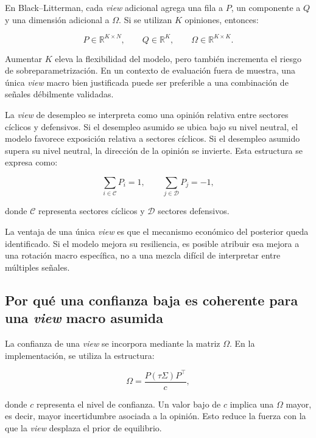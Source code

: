 \documentclass[11pt]{article}
\begin{document}
En Black--Litterman, cada \textit{view} adicional agrega una fila a $P$, un componente a $Q$ y una dimensi\'on adicional a $\Omega$. Si se utilizan $K$ opiniones, entonces:

\begin{equation}
    P \in \mathbb{R}^{K \times N},
    \qquad
    Q \in \mathbb{R}^{K},
    \qquad
    \Omega \in \mathbb{R}^{K \times K}.
\end{equation}

Aumentar $K$ eleva la flexibilidad del modelo, pero tambi\'en incrementa el riesgo de sobreparametrizaci\'on. En un contexto de evaluaci\'on fuera de muestra, una \'unica \textit{view} macro bien justificada puede ser preferible a una combinaci\'on de se\~nales d\'ebilmente validadas.

La \textit{view} de desempleo se interpreta como una opini\'on relativa entre sectores c\'iclicos y defensivos. Si el desempleo asumido se ubica bajo su nivel neutral, el modelo favorece exposici\'on relativa a sectores c\'iclicos. Si el desempleo asumido supera su nivel neutral, la direcci\'on de la opini\'on se invierte. Esta estructura se expresa como:

\begin{equation}
    \sum_{i \in \mathcal{C}} P_i = 1,
    \qquad
    \sum_{j \in \mathcal{D}} P_j = -1,
\end{equation}

donde $\mathcal{C}$ representa sectores c\'iclicos y $\mathcal{D}$ sectores defensivos.

La ventaja de una \'unica \textit{view} es que el mecanismo econ\'omico del posterior queda identificado. Si el modelo mejora su resiliencia, es posible atribuir esa mejora a una rotaci\'on macro espec\'ifica, no a una mezcla dif\'icil de interpretar entre m\'ultiples se\~nales.

\subsection{Por qu\'e una confianza baja es coherente para una \textit{view} macro asumida}

La confianza de una \textit{view} se incorpora mediante la matriz $\Omega$. En la implementaci\'on, se utiliza la estructura:

\begin{equation}
    \Omega
    =
    \frac{
    P(\tau\Sigma)P^\top
    }{c},
\end{equation}

donde $c$ representa el nivel de confianza. Un valor bajo de $c$ implica una $\Omega$ mayor, es decir, mayor incertidumbre asociada a la opini\'on. Esto reduce la fuerza con la que la \textit{view} desplaza el prior de equilibrio.
\end{document}
